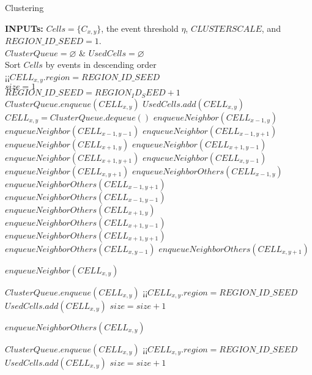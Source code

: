 \appendix

\begin{algorithm}\label{algorithm_connecting}
\caption{Clustering}
\begin{algorithmic}
\STATE \textbf{INPUTs:} $Cells=\{C_{x,y}\}$, the event threshold $\eta$, 
$CLUSTERSCALE$, and $REGION\_ID\_SEED=1$.\\
\STATE $ClusterQueue=\varnothing$ \& $UsedCells=\varnothing$\\
\STATE Sort $Cells$ by events in descending order\\
\STATE¡¡$CELL_{x,y}.region=REGION\_ID\_SEED$\\
\STATE  $size=1$\\
\STATE  $REGION\_ID\_SEED=REGION_ID_SEED+1$\\
\STATE $ClusterQueue.enqueue(CELL_{x,y})$
\STATE $UsedCells.add(CELL_{x,y})$
\STATE $CELL_{x,y}=ClusterQueue.dequeue()$
\STATE $enqueueNeighbor(CELL_{x-1,y})$
\STATE $enqueueNeighbor(CELL_{x-1,y-1})$
\STATE $enqueueNeighbor(CELL_{x-1,y+1})$
\STATE $enqueueNeighbor(CELL_{x+1,y})$
\STATE $enqueueNeighbor(CELL_{x+1,y-1})$
\STATE $enqueueNeighbor(CELL_{x+1,y+1})$
\STATE $enqueueNeighbor(CELL_{x,y-1})$
\STATE $enqueueNeighbor(CELL_{x,y+1})$
\ELSE
\STATE $enqueueNeighborOthers(CELL_{x-1,y})$
\STATE $enqueueNeighborOthers(CELL_{x-1,y+1})$
\STATE $enqueueNeighborOthers(CELL_{x-1,y-1})$
\STATE $enqueueNeighborOthers(CELL_{x+1,y})$
\STATE $enqueueNeighborOthers(CELL_{x+1,y-1})$
\STATE $enqueueNeighborOthers(CELL_{x+1,y+1})$
\STATE $enqueueNeighborOthers(CELL_{x,y-1})$
\STATE $enqueueNeighborOthers(CELL_{x,y+1})$
\ENDIF
\ENDWHILE
\ENDIF
\ENDFOR
\end{algorithmic}
\end{algorithm}



\begin{algorithm}
\caption{$enqueueNeighbor(CELL_{x,y})$}
\begin{algorithmic}
\STATE $ClusterQueue.enqueue(CELL_{x,y})$
\STATE¡¡$CELL_{x,y}.region=REGION\_ID\_SEED$
\STATE $UsedCells.add(CELL_{x,y})$
\STATE $size=size+1$
\ENDIF
\end{algorithmic}
\end{algorithm}

\begin{algorithm}
\caption{$enqueueNeighborOthers(CELL_{x,y})$}
\begin{algorithmic}
\STATE $ClusterQueue.enqueue(CELL_{x,y})$
\STATE¡¡$CELL_{x,y}.region=REGION\_ID\_SEED$\\
\STATE $UsedCells.add(CELL_{x,y})$
\STATE $size=size+1$
\ENDIF
\end{algorithmic}
\end{algorithm}
